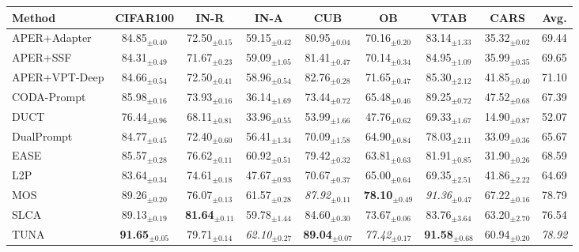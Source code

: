 \renewcommand{\arraystretch}{0.95}
\begin{adjustbox}{max width=\textwidth}
\footnotesize
\begin{tabular}{l c c c c c c c c}
\toprule
Method & \textbf{CIFAR100} & \textbf{IN-R} & \textbf{IN-A} & \textbf{CUB} & \textbf{OB} & \textbf{VTAB} & \textbf{CARS} & \textbf{Avg.} \\
\midrule
APER+Adapter & 84.85$_{\pm 0.40}$ & 72.50$_{\pm 0.15}$ & 59.15$_{\pm 0.42}$ & 80.95$_{\pm 0.04}$ & 70.16$_{\pm 0.20}$ & 83.14$_{\pm 1.33}$ & 35.32$_{\pm 0.02}$ & 69.44 \\
APER+SSF & 84.31$_{\pm 0.49}$ & 71.67$_{\pm 0.23}$ & 59.09$_{\pm 1.05}$ & 81.41$_{\pm 0.47}$ & 70.14$_{\pm 0.34}$ & 84.95$_{\pm 1.09}$ & 35.99$_{\pm 0.35}$ & 69.65 \\
APER+VPT-Deep & 84.66$_{\pm 0.54}$ & 72.50$_{\pm 0.41}$ & 58.96$_{\pm 0.54}$ & 82.76$_{\pm 0.28}$ & 71.65$_{\pm 0.47}$ & 85.30$_{\pm 2.12}$ & 41.85$_{\pm 0.40}$ & 71.10 \\
CODA-Prompt & 85.98$_{\pm 0.16}$ & 73.93$_{\pm 0.16}$ & 36.14$_{\pm 1.69}$ & 73.44$_{\pm 0.72}$ & 65.48$_{\pm 0.46}$ & 89.25$_{\pm 0.72}$ & 47.52$_{\pm 0.68}$ & 67.39 \\
DUCT & 76.44$_{\pm 0.96}$ & 68.11$_{\pm 0.81}$ & 33.96$_{\pm 0.55}$ & 53.99$_{\pm 1.66}$ & 47.76$_{\pm 0.62}$ & 69.33$_{\pm 1.67}$ & 14.90$_{\pm 0.87}$ & 52.07 \\
DualPrompt & 84.77$_{\pm 0.45}$ & 72.40$_{\pm 0.60}$ & 56.41$_{\pm 1.34}$ & 70.09$_{\pm 1.58}$ & 64.90$_{\pm 0.84}$ & 78.03$_{\pm 2.11}$ & 33.09$_{\pm 0.36}$ & 65.67 \\
EASE & 85.57$_{\pm 0.28}$ & 76.62$_{\pm 0.11}$ & 60.92$_{\pm 0.51}$ & 79.42$_{\pm 0.32}$ & 63.81$_{\pm 0.63}$ & 81.91$_{\pm 0.85}$ & 31.90$_{\pm 0.26}$ & 68.59 \\
L2P & 83.64$_{\pm 0.34}$ & 74.61$_{\pm 0.18}$ & 47.67$_{\pm 0.93}$ & 70.67$_{\pm 0.37}$ & 65.00$_{\pm 0.64}$ & 69.35$_{\pm 2.51}$ & 41.86$_{\pm 2.22}$ & 64.69 \\
MOS & 89.26$_{\pm 0.20}$ & 76.07$_{\pm 0.13}$ & 61.57$_{\pm 0.28}$ & \textit{87.92}$_{\pm 0.11}$ & \textbf{78.10}$_{\pm 0.49}$ & \textit{91.36}$_{\pm 0.47}$ & 67.22$_{\pm 0.16}$ & 78.79 \\
SLCA & 89.13$_{\pm 0.19}$ & \textbf{81.64}$_{\pm 0.11}$ & 59.78$_{\pm 1.44}$ & 84.60$_{\pm 0.30}$ & 73.67$_{\pm 0.06}$ & 83.76$_{\pm 3.64}$ & 63.20$_{\pm 2.70}$ & 76.54 \\
TUNA & \textbf{91.65}$_{\pm 0.05}$ & 79.71$_{\pm 0.14}$ & \textit{62.10}$_{\pm 0.27}$ & \textbf{89.04}$_{\pm 0.07}$ & \textit{77.42}$_{\pm 0.17}$ & \textbf{91.58}$_{\pm 0.68}$ & 60.94$_{\pm 0.20}$ & \textit{78.92} \\

\end{tabular}
\end{adjustbox}
